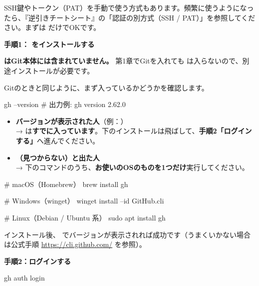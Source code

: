 \begin{hintbox}
SSH鍵やトークン（PAT）を手動で使う方式もあります。頻繁に使うようになったら、『逆引きチートシート』の「認証の別方式（SSH / PAT）」を参照してください。まずは  だけでOKです。
\end{hintbox}

\noindent\textbf{手順1： をインストールする}

\begin{warnbox}
\textbf{ はGit本体には含まれていません。} 第1章でGitを入れても  は入らないので、別途インストールが必要です。
\end{warnbox}

Gitのときと同じように、まず入っているかどうかを確認します。

\begin{codebox}[bash]
\begin{code}
gh --version
# 出力例: gh version 2.62.0
\end{code}
\end{codebox}

\begin{itemize}[leftmargin=1.4em]
  \item \textbf{バージョンが表示された人}（例：）\\
        →  は\textbf{すでに入っています}。下のインストールは飛ばして、\textbf{手順2「ログインする」}へ進んでください。
  \item \textbf{（見つからない）と出た人}\\
        → 下のコマンドのうち、\textbf{お使いのOSのものを1つだけ}実行してください。
\end{itemize}

\begin{codebox}[bash]
\begin{code}
# macOS（Homebrew）
brew install gh

# Windows（winget）
winget install --id GitHub.cli

# Linux（Debian / Ubuntu 系）
sudo apt install gh
\end{code}
\end{codebox}

インストール後、 でバージョンが表示されれば成功です（うまくいかない場合は公式手順 \url{https://cli.github.com/} を参照）。

\noindent\textbf{手順2：ログインする}

\begin{codebox}[bash]
\begin{code}
gh auth login
\end{code}
\end{codebox}

